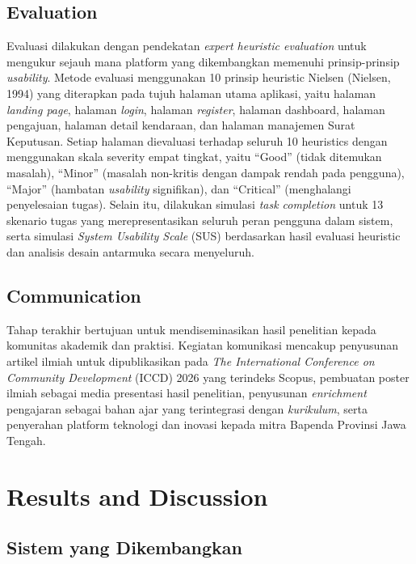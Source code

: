 \documentclass[conference]{IEEEtran}
\begin{document}
\subsection{Evaluation}
\label{subsec:evaluation}

Evaluasi dilakukan dengan pendekatan \emph{expert heuristic evaluation} untuk
mengukur sejauh mana platform yang dikembangkan memenuhi prinsip-prinsip
\emph{usability}. Metode evaluasi menggunakan 10 prinsip heuristic Nielsen (Nielsen,
1994) yang diterapkan pada tujuh halaman utama aplikasi, yaitu halaman
\emph{landing page}, halaman \emph{login}, halaman \emph{register}, halaman dashboard,
halaman pengajuan, halaman detail kendaraan, dan halaman manajemen Surat Keputusan.
Setiap halaman dievaluasi terhadap seluruh 10 heuristics dengan menggunakan skala
severity empat tingkat, yaitu ``Good'' (tidak ditemukan masalah), ``Minor''
(masalah non-kritis dengan dampak rendah pada pengguna), ``Major'' (hambatan
\emph{usability} signifikan), dan ``Critical'' (menghalangi penyelesaian tugas).
Selain itu, dilakukan simulasi \emph{task completion} untuk 13 skenario tugas yang
merepresentasikan seluruh peran pengguna dalam sistem, serta simulasi \emph{System
Usability Scale} (SUS) berdasarkan hasil evaluasi heuristic dan analisis desain
antarmuka secara menyeluruh.

\subsection{Communication}
\label{subsec:communication}

Tahap terakhir bertujuan untuk mendiseminasikan hasil penelitian kepada komunitas
akademik dan praktisi. Kegiatan komunikasi mencakup penyusunan artikel ilmiah untuk
dipublikasikan pada \emph{The International Conference on Community Development}
(ICCD) 2026 yang terindeks Scopus, pembuatan poster ilmiah sebagai media presentasi
hasil penelitian, penyusunan \emph{enrichment} pengajaran sebagai bahan ajar yang
terintegrasi dengan \emph{kurikulum}, serta penyerahan platform teknologi dan
inovasi kepada mitra Bapenda Provinsi Jawa Tengah.

\section{Results and Discussion}
\label{sec:results}

\subsection{Sistem yang Dikembangkan}
\label{subsec:sistem}
\end{document}
